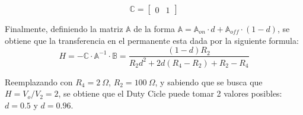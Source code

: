 \begin{equation}
\mathbb{C} =  \begin{bmatrix}
	0 & 1
\end{bmatrix}
\end{equation}

Finalmente, definiendo la matriz $\mathbb{A}$ de la forma $\mathbb{A} = \mathbb{A}_{on} \cdot d + \mathbb{A}_{off} \cdot \left( 1 - d \right)$, se obtiene que la transferencia en el permanente esta dada por la siguiente formula:
\begin{equation}
H = -\mathbb{C} \cdot \mathbb{A}^{-1} \cdot \mathbb{B} = \frac{\left( 1 - d \right) R_2}{R_2 d^2 + 2 d \left( R_4 - R_2 \right) + R_2 - R_4}
\end{equation}

Reemplazando con $R_4 = 2 \ \Omega$, $R_2 = 100 \ \Omega$, y sabiendo que se busca que $H = V_o / V_2 = 2$, se obtiene que el Duty Cicle puede tomar 2 valores posibles: $d = 0.5$ y $d = 0.96$.

%

